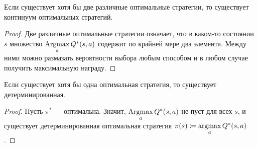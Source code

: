 \begin{proposition}
Если существует хотя бы две различные оптимальные стратегии, то существует континуум оптимальных стратегий.
\begin{proof}
Две различные оптимальные стратегии означает, что в каком-то состоянии $s$ множество $\mathop{\mathrm{Argmax}}\limits_a Q^*(s, a)$ содержит по крайней мере два элемента. Между ними можно размазать вероятности выбора любым способом и в любом случае получить максимальную награду.
\end{proof}
\end{proposition}

\begin{proposition}
Если существует хотя бы одна оптимальная стратегия, то существует детерминированная.
\begin{proof}
Пусть $\pi^*$ --- оптимальна. Значит, $\mathop{\mathrm{Argmax}}\limits_a Q^*(s, a)$ не пуст для всех $s$, и существует детерминированная оптимальная стратегия $\pi(s) \coloneqq \mathop{\mathrm{argmax}}\limits_a Q^*(s, a)$.
\end{proof}
\end{proposition}

